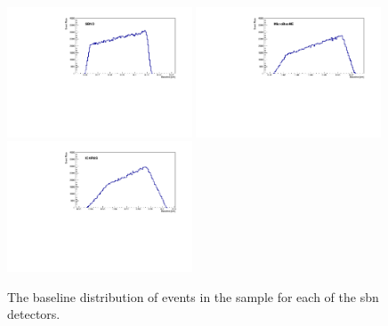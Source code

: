\begin{figure}[h!]
    \centering
    \includegraphics[width = 0.49\textwidth]{figures-chap5/SBND_numu.pdf}
    \includegraphics[width = 0.49\textwidth]{figures-chap5/MicroBooNE_numu.pdf}
    \includegraphics[width = 0.49\textwidth]{figures-chap5/ICARUS_numu.pdf}
    \captionsetup{width=0.45\textwidth}
    \parbox[b]{0.49\textwidth}%
  {
    \caption{The baseline distribution of events in the \numu sample for each of the \gls{sbn} detectors. \\\phantom{.}\\}
    \label{fig:numu_baseline}}
\end{figure}



